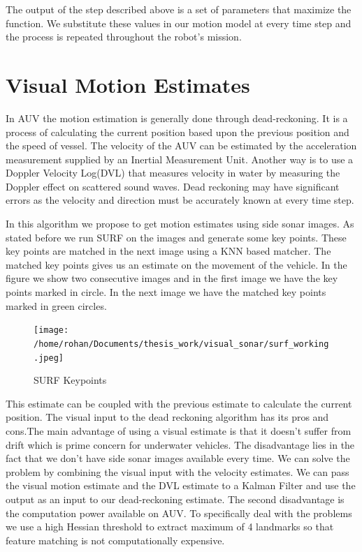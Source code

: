 \documentclass[12pt]{dalcsthesis}
\begin{document}
{The output of the step described above is a set of parameters that
maximize the function. We substitute these values in our motion model
at every time step and the process is repeated throughout the robot's
mission. 
\section{Visual Motion Estimates}
In AUV the motion estimation is generally done through dead-reckoning.
It is a process of calculating the current position based upon the
previous position and the speed of vessel. The velocity of the AUV
can be estimated by the acceleration measurement supplied by an Inertial
Measurement Unit. Another way is to use a Doppler Velocity Log(DVL) that
measures velocity in water by measuring the Doppler effect on scattered
sound waves. Dead reckoning may have significant errors as the velocity
and direction must be accurately known at every time step. 

In this algorithm we propose to get motion estimates using side sonar
images. As stated before we run SURF on the images and generate some
key points. These key points are matched in the next image using a
KNN based matcher. The matched key points gives us an estimate on
the movement of the vehicle. In the figure we show two consecutive
images and in the first image we have the key points marked in circle.
In the next image we have the matched key points marked in green circles. 
\begin{figure}[hbtp]
\caption{SURF Keypoints}
\centering
\texttt{[image: /home/rohan/Documents/thesis\_work/visual\_sonar/surf\_working.jpeg]}
\end{figure}
This estimate can be coupled with the previous estimate to calculate
the current position. The visual input to the dead reckoning algorithm
has its pros and cons.The main advantage of using a visual estimate
is that it doesn't suffer from drift which is prime concern for underwater
vehicles. The disadvantage lies in the fact that we don't have side
sonar images available every time. We can solve the problem by combining
the visual input with the velocity estimates. We can pass the visual
motion estimate and the DVL estimate to a Kalman Filter and use the
output as an input to our dead-reckoning estimate. The second disadvantage
is the computation power available on AUV. To specifically deal with
the problems we use a high Hessian threshold to extract maximum of
4 landmarks so that feature matching is not computationally expensive. 

}
\end{document}
